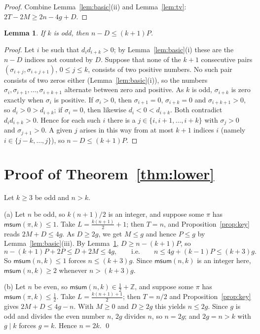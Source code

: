 \documentclass[11pt]{amsart}
\newtheorem{lemma}[theorem]{Lemma}
\theoremstyle{remark}
\newcommand{\msum}{\mathsf{msum}}
\newcommand{\Z}{\mathbb{Z}}
\begin{document}
\begin{proof}
Combine Lemma~\ref{lem:basic}(ii) and Lemma~\ref{lem:tv}: $2T-2M\ge 2n-4g+D$.
\end{proof}

\begin{lemma}\label{lem:pairs}
If $k$ is odd, then $n-D\le(k+1)P$.
\end{lemma}

\begin{proof}
Let $i$ be such that $d_id_{i+k}>0$; by Lemma~\ref{lem:basic}(i) these are the $n-D$ indices not counted by $D$.
Suppose that none of the $k+1$ consecutive pairs $(\sigma_{i+j},\sigma_{i+j+1})$, $0\le j\le k$, consists of two
positive numbers. No such pair consists of two zeros either (Lemma~\ref{lem:basic}(i)), so the numbers
$\sigma_i,\sigma_{i+1},\dots,\sigma_{i+k+1}$ alternate between zero and positive. As $k$ is odd, $\sigma_{i+k}$ is
zero exactly when $\sigma_i$ is positive. If $\sigma_i>0$, then $\sigma_{i+1}=0$, $\sigma_{i+k}=0$ and
$\sigma_{i+k+1}>0$, so $d_i>0>d_{i+k}$; if $\sigma_i=0$, then likewise $d_i<0<d_{i+k}$. Both contradict
$d_id_{i+k}>0$. Hence for each such $i$ there is a $j\in\{i,i+1,\dots,i+k\}$ with $\sigma_j>0$ and $\sigma_{j+1}>0$.
A given $j$ arises in this way from at most $k+1$ indices $i$ (namely $i\in\{j-k,\dots,j\}$), so $n-D\le(k+1)P$.
\end{proof}

\section{Proof of Theorem~\ref{thm:lower}}

Let $k\ge3$ be odd and $n>k$.

(a) Let $n$ be odd, so $k(n+1)/2$ is an integer, and suppose some $\pi$ has $\msum(\pi,k)\le1$. Take
$L=\frac{k(n+1)}{2}+1$; then $T=n$, and Proposition~\ref{prop:key} reads $2M+D\le 4g$. As $D\ge 2g$, we get $M\le g$
and hence $P\le g$ by Lemma~\ref{lem:basic}(iii). By Lemma~\ref{lem:pairs}, $D\ge n-(k+1)P$, so
\[
  n-(k+1)P+2P\le D+2M\le 4g ,\qquad\text{i.e.}\qquad n\le 4g+(k-1)P\le (k+3)g .
\]
So $\msum(n,k)\le 1$ forces $n\le(k+3)g$. Since $\msum(n,k)$ is an integer here, $\msum(n,k)\ge2$ whenever
$n>(k+3)g$.

(b) Let $n$ be even, so $\msum(n,k)\in\frac12+\Z$, and suppose some $\pi$ has $\msum(\pi,k)\le\frac12$. Take
$L=\frac{k(n+1)+1}{2}$; then $T=n/2$ and Proposition~\ref{prop:key} gives $2M+D\le 4g-n$. With $M\ge0$ and
$D\ge2g$ this yields $n\le 2g$. Since $g$ is odd and divides the even number $n$, $2g$ divides $n$, so $n=2g$; and
$2g=n>k$ with $g\mid k$ forces $g=k$. Hence $n=2k$. \qed
\end{document}
